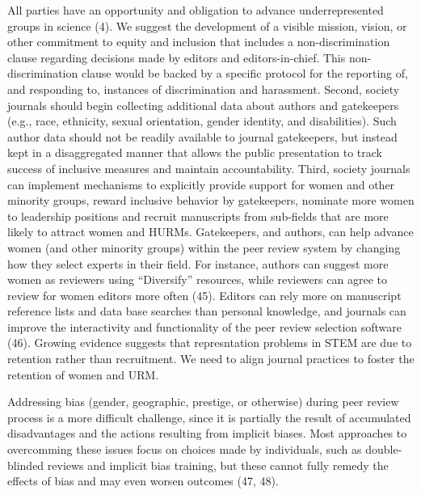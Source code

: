 \documentclass[11pt,]{article}
\begin{document}
All parties have an opportunity and obligation to advance
underrepresented groups in science (4). We suggest the development of a
visible mission, vision, or other commitment to equity and inclusion
that includes a non-discrimination clause regarding decisions made by
editors and editors-in-chief. This non-discrimination clause would be
backed by a specific protocol for the reporting of, and responding to,
instances of discrimination and harassment. Second, society journals
should begin collecting additional data about authors and gatekeepers
(e.g., race, ethnicity, sexual orientation, gender identity, and
disabilities). Such author data should not be readily available to
journal gatekeepers, but instead kept in a disaggregated manner that
allows the public presentation to track success of inclusive measures
and maintain accountability. Third, society journals can implement
mechanisms to explicitly provide support for women and other minority
groups, reward inclusive behavior by gatekeepers, nominate more women to
leadership positions and recruit manuscripts from sub-fields that are
more likely to attract women and HURMs. Gatekeepers, and authors, can
help advance women (and other minority groups) within the peer review
system by changing how they select experts in their field. For instance,
authors can suggest more women as reviewers using ``Diversify''
resources, while reviewers can agree to review for women editors more
often (45). Editors can rely more on manuscript reference lists and data
base searches than personal knowledge, and journals can improve the
interactivity and functionality of the peer review selection software
(46). Growing evidence suggests that represntation problems in STEM are
due to retention rather than recruitment. We need to align journal
practices to foster the retention of women and URM.

Addressing bias (gender, geographic, prestige, or otherwise) during peer
review process is a more difficult challenge, since it is partially the
result of accumulated disadvantages and the actions resulting from
implicit biases. Most approaches to overcomming these issues focus on
choices made by individuals, such as double-blinded reviews and implicit
bias training, but these cannot fully remedy the effects of bias and may
even worsen outcomes (47, 48).
\end{document}
